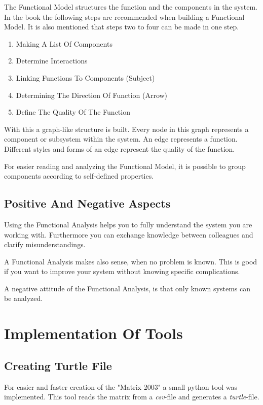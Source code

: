 \documentclass[11pt,a4paper]{article}
\begin{document}
The Functional Model structures the function and the components in the system.
In the book the following steps are recommended when building a Functional
Model.  It is also mentioned that steps two to four can be made in one step.

\begin{enumerate}
\item Making A List Of Components
\item Determine Interactions
\item Linking Functions To Components (Subject)
\item Determining The Direction Of Function (Arrow)
\item Define The Quality Of The Function
\end{enumerate}

With this a graph-like structure is built.  Every node in this graph
represents a component or subsystem within the system.  An edge represents a
function.  Different styles and forms of an edge represent the quality of the
function.

For easier reading and analyzing the Functional Model, it is possible to group
components according to self-defined properties.

\subsection{Positive And Negative Aspects}

Using the Functional Analysis helps you to fully understand the system you are working with.
Furthermore you can exchange knowledge between colleagues and clarify misunderstandings.

A Functional Analysis makes also sense, when no problem is known.
This is good if you want to improve your system without knowing specific complications.

A negative attitude of the Functional Analysis, is that only known systems can be analyzed.

\section{Implementation Of Tools}

\subsection{Creating Turtle File}

For easier and faster creation of the "Matrix 2003" a small python tool was
implemented.  This tool reads the matrix from a \textit{csv}-file and
generates a \textit{turtle}-file.
\end{document}
